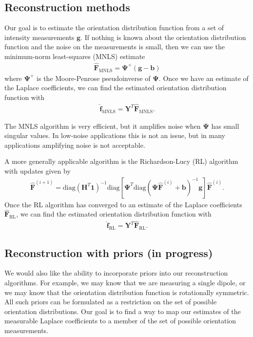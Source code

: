 \documentclass[10pt]{article}
\providecommand{\mb}[1]{\mathbf{#1}}
\begin{document}
\subsection{Reconstruction methods}
Our goal is to estimate the orientation distribution function from a set of
intensity measurements $\mb{g}$. If nothing is known about the orientation
distribution function and the noise on the measurements is small, then we can
use the minimum-norm least-squares (MNLS) estimate
\begin{align}
  \hat{\mb{F}}_\text{MNLS} = \mb{\Psi}^+(\mb{g}-\mb{b}) \label{eq:mnls_est}
\end{align}
where $\mathbf{\Psi}^+$ is the Moore-Penrose pseudoinverse of
$\mb{\Psi}$. Once we have an estimate of the Laplace coefficients, we can
find the estimated orientation distribution function with
\begin{align}
  \hat{\mb{f}}_\text{MNLS} = \mb{Y}^T\hat{\mb{F}}_\text{MNLS}. \label{eq:mnls}
\end{align}

The MNLS algorithm is very efficient, but it amplifies noise when $\mb{\Psi}$
has small singular values. In low-noise applications this is not an issue, but
in many applications amplifying noise is not acceptable.

A more generally applicable algorithm is the Richardson-Lucy (RL) algorithm with
updates given by
\begin{align}
  \hat{\mb{F}}^{(i+1)} = \text{diag}(\mathbf{H}^T\textbf{1})^{-1}\text{diag}\left[\mb{\Psi}^T\text{diag}(\mb{\Psi}\hat{\mb{F}}^{(i)} + \mb{b})^{-1}\mb{g}\right]\hat{\mb{F}}^{(i)}. \label{eq:rl_est}
\end{align}
Once the RL algorithm has converged to an estimate of the Laplace coefficients
$\hat{\mb{F}}_\text{RL}$, we can find the estimated orientation distribution function
with
\begin{align}
  \hat{\mb{f}}_\text{RL} = \mb{Y}^T\hat{\mb{F}}_\text{RL}. \label{eq:rl}
\end{align}

\subsection{Reconstruction with priors (in progress)}

We would also like the ability to incorporate priors into our reconstruction
algorithms. For example, we may know that we are measuring a single dipole, or
we may know that the orientation distribution function is rotationally
symmetric. All such priors can be formulated as a restriction on the set of
possible orientation distributions. Our goal is to find a way to map our
estimates of the measurable Laplace coefficients to a member of the set of
possible orientation measurements.
\end{document}
